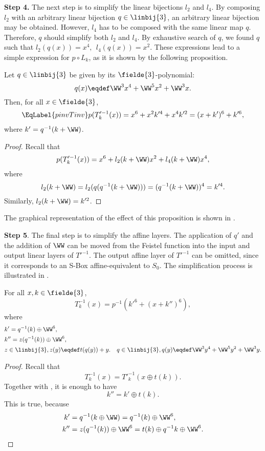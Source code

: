 \textbf{Step 4.}
The next step is to simplify the linear bijections $l_2$ and $l_4$. By composing $l_2$ with an arbitrary linear bijection $q \in \linbij{3}$, an arbitrary linear bijection may be obtained. However, $l_4$ has to be composed with the same linear map $q$. Therefore, $q$ should simplify both $l_2$ and $l_4$. By exhaustive search of $q$, we found $q$ such that
$l_2(q(x)) = x^4, ~~l_4(q(x)) = x^2$. These expressions lead to a simple expression for $p\circ L_k$, as it is shown by the following proposition.

\begin{proposition}
Let $q \in \linbij{3}$ be given by its $\fielde{3}$-polynomial:
$$
q(x) \eqdef \WW^3x^4 + \WW^5x^2 + \WW^3x.
$$
Then, for all $x \in \fielde{3}$,
\begin{equation}
    \EqLabel{pinvTinv}
    p(T'^{-1}_{k}(x))
        = x^6 + x^2k'^4 + x^4k'^2 
        = (x + k')^6 + k'^6,
\end{equation}
where $k' = q^{-1}(k + \WW)$.
\end{proposition}
\begin{proof}
Recall that
$$
p(T'^{-1}_{k}(x)) = x^6 + l_2(k+\WW)x^2 + l_4(k+\WW)x^4,
$$
where
$$
l_2(k+\WW) = l_2(q(q^{-1}(k+\WW))) = (q^{-1}(k+\WW))^4 = k'^4.
$$
Similarly,
$l_2(k+\WW) = k'^2$.
\end{proof}

The graphical representation of the effect of this proposition is shown in .


\textbf{Step 5}.
The final step is to simplify the affine layers. The application of $q'$ and the addition of $\WW$ can be moved from the Feistel function into the input and output linear layers of $T'^{-1}$. The output affine layer of $T'^{-1}$ can be omitted, since it corresponds to an S-Box affine-equivalent to $S_0$. The simplification process is illustrated in .


\begin{proposition}[Decomposition of $T'^{-1}$]
For all $x,k \in \fielde{3}$,
$$
T^{-1}_k(x) = p^{-1}(k'^6 + (x + k'')^6),
$$
where 
\begin{align*}
    & k' =  q^{-1}(k) \oplus \WW^6,\\
    & k'' = z(q^{-1}(k)) \oplus \WW^6,\\
    & z\in \linbij{3}, z(y) \eqdef t(q(y)) + y.
    & q \in \linbij{3}, q(y) \eqdef \WW^3y^4 + \WW^5y^2 + \WW^3y.
\end{align*}
\end{proposition}
\begin{proof}
Recall that
$$
T^{-1}_k(x) = T'^{-1}_k(x \oplus t(k)).
$$
Together with , it is enough to have
$$
k'' = k' \oplus t(k).
$$
This is true, because
\begin{align*}
k' &= q^{-1}(k \oplus \WW) = q^{-1}(k) \oplus \WW^6, \\
k'' &= z(q^{-1}(k))\oplus \WW^6 = t(k) \oplus q^{-1}{k} \oplus \WW^6.
\end{align*}
\end{proof}


